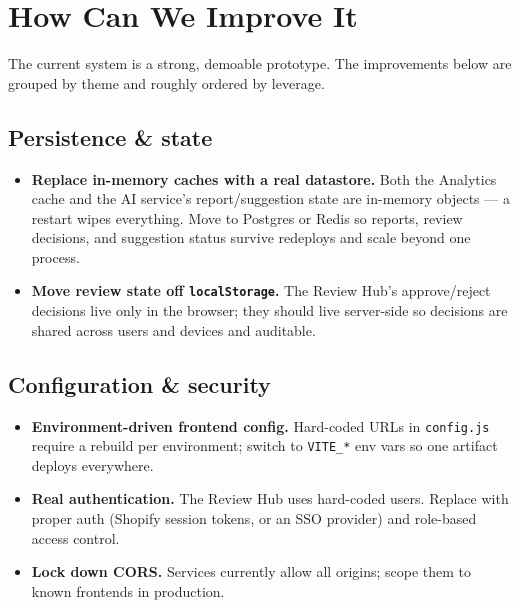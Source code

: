 \documentclass[11pt,a4paper]{article}
\begin{document}
\section{How Can We Improve It}\label{sec:improve}

The current system is a strong, demoable prototype. The improvements below are
grouped by theme and roughly ordered by leverage.

\subsection{Persistence \& state}
\begin{itemize}[leftmargin=1.4em]
  \item \textbf{Replace in-memory caches with a real datastore.} Both the
  Analytics cache and the AI service's report/suggestion state are in-memory
  objects --- a restart wipes everything. Move to Postgres or Redis so reports,
  review decisions, and suggestion status survive redeploys and scale beyond
  one process.
  \item \textbf{Move review state off \texttt{localStorage}.} The Review Hub's
  approve/reject decisions live only in the browser; they should live server-side
  so decisions are shared across users and devices and auditable.
\end{itemize}

\subsection{Configuration \& security}
\begin{itemize}[leftmargin=1.4em]
  \item \textbf{Environment-driven frontend config.} Hard-coded URLs in
  \texttt{config.js} require a rebuild per environment; switch to
  \texttt{VITE\_*} env vars so one artifact deploys everywhere.
  \item \textbf{Real authentication.} The Review Hub uses hard-coded users.
  Replace with proper auth (Shopify session tokens, or an SSO provider) and
  role-based access control.
  \item \textbf{Lock down CORS.} Services currently allow all origins; scope
  them to known frontends in production.
\end{itemize}
\end{document}
